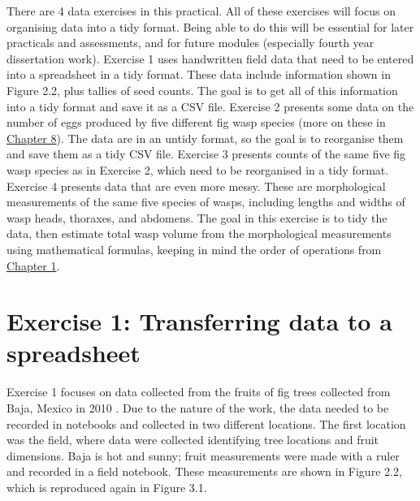\documentclass[
]{scrbook}
\begin{document}
There are 4 data exercises in this practical.
All of these exercises will focus on organising data into a tidy format.
Being able to do this will be essential for later practicals and assessments, and for future modules (especially fourth year dissertation work).
Exercise 1 uses handwritten field data that need to be entered into a spreadsheet in a tidy format.
These data include information shown in Figure 2.2, plus tallies of seed counts.
The goal is to get all of this information into a tidy format and save it as a CSV file.
Exercise 2 presents some data on the number of eggs produced by five different fig wasp species (more on these in \protect\hyperlink{Chapter_8}{Chapter 8}).
The data are in an untidy format, so the goal is to reorganise them and save them as a tidy CSV file.
Exercise 3 presents counts of the same five fig wasp species as in Exercise 2, which need to be reorganised in a tidy format.
Exercise 4 presents data that are even more messy.
These are morphological measurements of the same five species of wasps, including lengths and widths of wasp heads, thoraxes, and abdomens.
The goal in this exercise is to tidy the data, then estimate total wasp volume from the morphological measurements using mathematical formulas, keeping in mind the order of operations from \protect\hyperlink{Chapter_1}{Chapter 1}.

\hypertarget{exercise-1-transferring-data-to-a-spreadsheet}{%
\section{Exercise 1: Transferring data to a spreadsheet}\label{exercise-1-transferring-data-to-a-spreadsheet}}

Exercise 1 focuses on data collected from the fruits of fig trees collected from Baja, Mexico in 2010 \citep{Duthie2015b, Duthie2016}.
Due to the nature of the work, the data needed to be recorded in notebooks and collected in two different locations.
The first location was the field, where data were collected identifying tree locations and fruit dimensions.
Baja is hot and sunny; fruit measurements were made with a ruler and recorded in a field notebook.
These measurements are shown in Figure 2.2, which is reproduced again in Figure 3.1.
\end{document}
